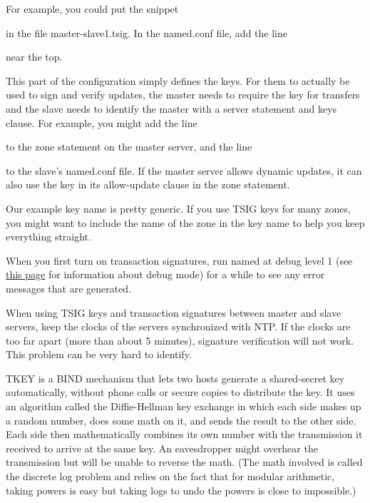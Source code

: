 For example, you could put the snippet


in the file {master-slave1.tsig}. In the {named.conf} file, add the line


near the top.

This part of the configuration simply defines the keys. For them to
actually be used to sign and verify updates, the master needs to require
the key for transfers and the slave needs to identify the master with a
{server} statement and {keys} clause. For example, you might add the
line


to the {zone} statement on the master server, and the line


to the slave's {named.conf} file. If the master server allows dynamic
updates, it can also use the key in its {allow-update} clause in the
{zone} statement.

Our example key name is pretty generic. If you use TSIG keys for many
zones, you might want to include the name of the zone in the key name to
help you keep everything straight.

When you first turn on transaction signatures, run {named} at debug
level 1 (see
\protect\hyperlink{part0024_split_069.htmlux5cux23_idTextAnchor954}{this
page} for information about debug mode) for a while to see any error
messages that are generated.

When using TSIG keys and transaction signatures between master and slave
servers, keep the clocks of the servers synchronized with NTP. If the
clocks are too far apart (more than about 5 minutes), signature
verification will not work. This problem can be very hard to identify.

TKEY is a BIND mechanism that lets two hosts generate a shared-secret
key automatically, without phone calls or secure copies to distribute
the key. It uses an algorithm called the
\protect\hypertarget{part0024_split_058.htmlux5cux23_idIndexMarker2247}{}{}Diffie-Hellman
key exchange in which each side makes up a random number, does some math
on it, and sends the result to the other side. Each side then
mathematically combines its own number with the transmission it received
to arrive at the same key. An eavesdropper might overhear the
transmission but will be unable to reverse the math. (The math involved
is called the discrete log problem and relies on the fact that for
modular arithmetic, taking powers is easy but taking logs to undo the
powers is close to impossible.)


